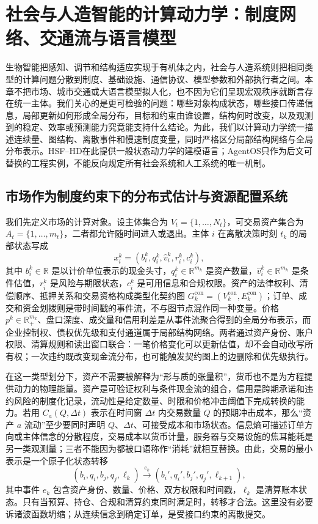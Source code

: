 \chapter{社会与人造智能的计算动力学：制度网络、交通流与语言模型}
\label{chp:social_artificial_intelligence}

生物智能把感知、调节和结构适应实现于有机体之内，社会与人造系统则把相同类型的计算问题分散到制度、基础设施、通信协议、模型参数和外部执行者之间。本章不把市场、城市交通或大语言模型拟人化，也不因为它们呈现宏观秩序就断言存在统一主体。我们关心的是更可检验的问题：哪些对象构成状态，哪些接口传递信息，局部更新如何形成全局分布，目标和约束由谁设置，结构何时改变，以及观测到的稳定、效率或预测能力究竟能支持什么结论。为此，我们以计算动力学统一描述连续量、图结构、离散事件和慢速制度变量，同时严格区分局部结构网络与全局分布表示。HSF--HD在此提供一般状态动力学的建模语言；AgentOS只作为后文可替换的工程实例，不能反向规定所有社会系统和人工系统的唯一机制。

\section{市场作为制度约束下的分布式估计与资源配置系统}
\label{sec:section_4093}

我们先定义市场的计算对象。设主体集合为 $V_t=\{1,\ldots,N_t\}$，可交易资产集合为 $A_t=\{1,\ldots,m_t\}$，二者都允许随时间进入或退出。主体 $i$ 在离散决策时刻 $t_k$ 的局部状态写成
\[
x_i^k=(b_i^k,q_i^k,\hat v_i^k,r_i^k,c_i^k),
\]
其中 $b_i^k\in\mathbb{R}$ 是以计价单位表示的现金头寸，$q_i^k\in\mathbb{R}^{m_k}$ 是资产数量，$\hat v_i^k\in\mathbb{R}^{m_k}$ 是条件估值，$r_i^k$ 是风险与期限状态，$c_i^k$ 是可用信息和合规权限。资产的法律权利、清偿顺序、抵押关系和交易资格构成类型化契约图 $G_k^{\mathrm{con}}=(V_k^{\mathrm{con}},E_k^{\mathrm{con}})$；订单、成交和资金划拨则是带时间戳的事件流，不与图节点混作同一种变量。价格 $p^k\in\mathbb{R}_{+}^{m_k}$、盘口深度、成交量和信用利差是从事件流聚合得到的全局分布表示，而企业控制权、债权优先级和支付通道属于局部结构网络。两者通过资产身份、账户权限、清算规则和读出窗口联合：一笔价格变化可以更新估值，却不会自动改写所有权；一次违约既改变现金流分布，也可能触发契约图上的边删除和优先级执行。

在这一类型划分下，资产不需要被解释为“形与质的张量积”，货币也不是为方程提供动力的物理能量。资产是可验证权利与条件现金流的组合，信用是跨期承诺和违约风险的制度化记录，流动性是给定数量、时限和价格冲击阈值下完成转换的能力。若用 $C_a(Q,\Delta t)$ 表示在时间窗 $\Delta t$ 内交易数量 $Q$ 的预期冲击成本，那么“资产 $a$ 流动”至少要同时声明 $Q$、$\Delta t$、可接受成本和市场状态。信息熵可描述订单方向或主体信念的分散程度，交易成本以货币计量，服务器与交易设施的焦耳能耗是另一类观测量；三者不能因为都被口语称作“消耗”就相互替换。由此，交易的最小表示是一个原子化状态转移
\[
(b_i,q_i,b_j,q_j,\ell_k)\xrightarrow{e_k}
(b_i',q_i',b_j',q_j',\ell_{k+1}),
\]
其中事件 $e_k$ 包含资产身份、数量、价格、双方权限和时间戳，$\ell_k$ 是清算账本状态。只有当预算、持仓、合规和清算约束同时满足时，转移才合法。这里没有必要诉诸波函数坍缩；从连续信念到确定订单，是受接口约束的离散提交。

